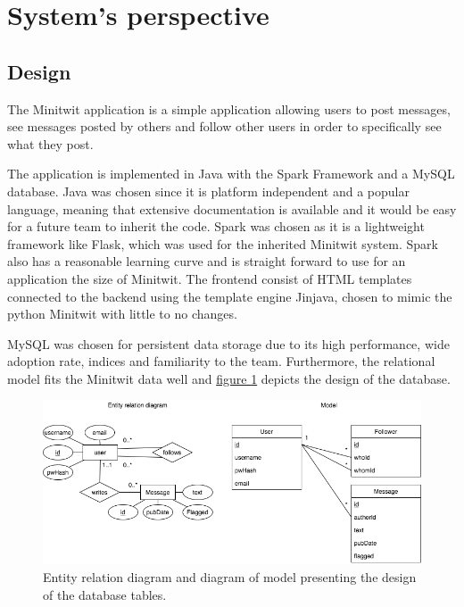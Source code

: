 \section{System's perspective} \label{section:System perspective}
\subsection{Design}
The Minitwit application is a simple application allowing users to post messages, see messages posted by others and follow other users in order to specifically see what they post.

The application is implemented in Java with the Spark Framework and a MySQL database. Java was chosen since it is platform independent and a popular language, meaning that extensive documentation is available and it would be easy for a future team to inherit the code. Spark was chosen as it is a lightweight framework like Flask, which was used for the inherited Minitwit system. Spark also has a reasonable learning curve and is straight forward to use for an application the size of Minitwit. The frontend consist of HTML templates connected to the backend using the template engine Jinjava, chosen to mimic the python Minitwit with little to no changes. 

MySQL was chosen for persistent data storage due to its high performance, wide adoption rate, indices and familiarity to the team. Furthermore, the relational model fits the Minitwit data well and \hyperref[fig:classDiagramModel]{figure \ref{fig:databaseDiagram}} depicts the design of the database.
\begin{figure}[H]
    \centering
    \includegraphics[width=1\textwidth]{images/Diagrams-DB.png}
    \caption{Entity relation diagram and diagram of model presenting the design of the database tables.}
    \label{fig:databaseDiagram}
\end{figure} 
\vspace{3mm}

